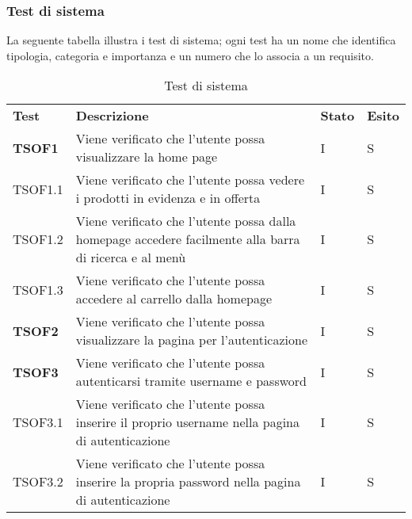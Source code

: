 \subsubsection{Test di sistema}
La seguente tabella illustra i test di sistema; ogni test ha un nome che identifica tipologia, categoria e importanza e un numero che lo associa a un requisito.
\begin{center}
    \centering
    \renewcommand{\arraystretch}{1.8}
    \label{tab:TestSistema}
    \begin{longtable}[!h]{p{60px} p{240px} p{35px} p{35px}}
        \caption{Test di sistema}                                                                                                                               \\
        \rowcolor{logo!70}
        \textbf{Test}   & \textbf{Descrizione}                                                                                & \textbf{Stato} & \textbf{Esito} \\
        \textbf{TSOF1}  & Viene verificato che l'utente possa visualizzare la home page                                                       & I              & S              \\
        TSOF1.1         & Viene verificato che l'utente possa vedere i prodotti in evidenza e in offerta                                      & I              & S              \\
        TSOF1.2         & Viene verificato che l'utente possa dalla homepage accedere facilmente alla barra di ricerca e al menù             & I              & S              \\
        TSOF1.3         & Viene verificato che l'utente possa accedere al carrello dalla homepage                                            & I              & S              \\
        \textbf{TSOF2}  & Viene verificato che l'utente possa visualizzare la pagina per l'autenticazione                                     & I              & S              \\
        \textbf{TSOF3}  & Viene verificato che l'utente possa autenticarsi tramite username e password                                        & I              & S              \\
        TSOF3.1         & Viene verificato che l'utente possa inserire il proprio username nella pagina di autenticazione                     & I              & S              \\
        TSOF3.2         & Viene verificato che l'utente possa inserire la propria password nella pagina di autenticazione                     & I              & S              \\

\end{longtable}
\end{center}
